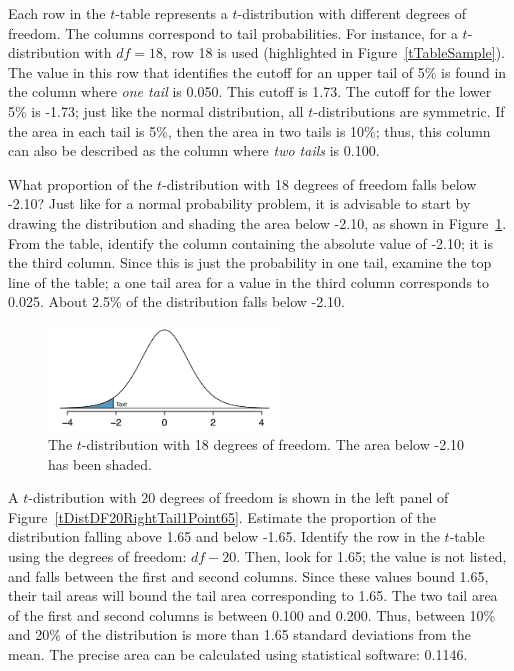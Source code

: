 Each row in the $t$-table represents a $t$-distribution with different degrees of freedom. The columns correspond to tail probabilities. For instance, for a $t$-distribution with $df=18$, row 18 is used (highlighted in Figure~\ref{tTableSample}). The value in this row that identifies the cutoff for an upper tail of 5\% is found in the column where \emph{one tail} is 0.050. This cutoff is 1.73. The cutoff for the lower 5\% is -1.73; just like the normal distribution, all $t$-distributions are symmetric. If the area in each tail is 5\%, then the area in two tails is 10\%; thus, this column can also be described as the column where \emph{two tails} is 0.100.

\textD{\newpage}

\begin{examplewrap}
\begin{nexample}{What proportion of the $t$-distribution with 18 degrees of freedom falls below -2.10?}
Just like for a normal probability problem, it is advisable to start by drawing the distribution and shading the area below -2.10, as shown in Figure~\ref{tDistDF18LeftTail2Point10}. From the table, identify the column containing the absolute value of -2.10; it is the third column. Since this is just the probability in one tail, examine the top line of the table; a one tail area for a value in the third column corresponds to 0.025. About 2.5\% of the distribution falls below -2.10.	
\end{nexample}
\end{examplewrap}

\begin{figure}[h]
\centering
\includegraphics[width=0.55\textwidth]{ch_inference_for_means_oi_biostat/figures/tDistDF18LeftTail2Point10/tDistDF18LeftTail2Point10}
\caption{The $t$-distribution with 18 degrees of freedom. The area below -2.10 has been shaded.}
\label{tDistDF18LeftTail2Point10}
\end{figure}

\begin{examplewrap}
\begin{nexample}{A $t$-distribution with 20 degrees of freedom is shown in the left panel of Figure~\ref{tDistDF20RightTail1Point65}. Estimate the proportion of the distribution falling above 1.65 and below -1.65.}
Identify the row in the $t$-table using the degrees of freedom: $df-20$. Then, look for 1.65; the value is not listed, and falls between the first and second columns. Since these values bound 1.65, their tail areas will bound the tail area corresponding to 1.65. The two tail area of the first and second columns is between 0.100 and 0.200. Thus, between 10\% and 20\% of the distribution is more than 1.65 standard deviations from the mean. The precise area can be calculated using statistical software: 0.1146.
\end{nexample}
\end{examplewrap}

